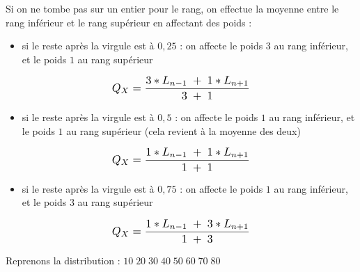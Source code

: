 \documentclass[11pt,a4paper]{article}
\begin{document}
Si on ne tombe pas sur un entier pour le rang, on effectue la moyenne entre le rang inférieur et le rang supérieur en affectant des poids :

\bigskip

\begin{itemize}
\item si le reste après la virgule est à $ 0,25 $ : on affecte le poids $ 3 $ au rang inférieur, et le poids $ 1 $ au rang supérieur
\end{itemize}
\vspace*{-1cm}
\begin{center}
\[ \scalebox{1.15}{$\displaystyle Q_{X} = \frac{3 * L_{n - 1} \; + \; 1 * L_{n + 1}}{3 \; + \; 1} $} \]
\end{center}

\begin{itemize}
\item si le reste après la virgule est à $ 0,5 $ : on affecte le poids $ 1 $ au rang inférieur, et le poids $ 1 $ au rang supérieur (cela revient à la moyenne des deux)
\end{itemize}
\vspace*{-1cm}
\begin{center}
\[ \scalebox{1.15}{$\displaystyle Q_{X} = \frac{1 * L_{n - 1} \; + \; 1 * L_{n + 1}}{1 \; + \; 1} $} \]
\end{center}

\begin{itemize}
\item si le reste après la virgule est à $ 0,75 $ : on affecte le poids $ 1 $ au rang inférieur, et le poids $ 3 $ au rang supérieur
\end{itemize}
\vspace*{-1cm}
\begin{center}
\[ \scalebox{1.15}{$\displaystyle Q_{X} = \frac{1 * L_{n - 1} \; + \; 3 * L_{n + 1}}{1 \; + \; 3} $} \]
\end{center}


\bigskip
\bigskip

Reprenons la distribution : $ 10 \; 20 \; 30 \; 40 \; 50 \; 60 \; 70 \; 80 $
\end{document}
